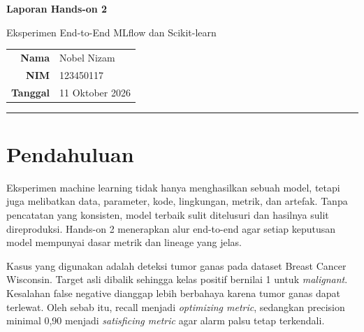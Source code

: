 \documentclass[11pt,a4paper]{article}
\begin{document}
\begin{center}
  {\LARGE\bfseries\color{navy} Laporan Hands-on 2}\par
  \vspace{3pt}
  {\large Eksperimen End-to-End MLflow dan Scikit-learn}\par
  \vspace{10pt}
  \begin{tabular}{rl}
    \textbf{Nama} & Nobel Nizam \\
    \textbf{NIM}  & 123450117 \\
    \textbf{Tanggal} & 11 Oktober 2026
  \end{tabular}
\end{center}

\vspace{8pt}
\hrule
\vspace{8pt}

\begin{abstract}
Praktik ini membangun alur eksperimen klasifikasi tumor ganas dari persiapan data hingga rancangan pemuatan model produksi. Dataset Breast Cancer Wisconsin dibagi secara tetap, kemudian delapan konfigurasi baseline dan kandidat dibandingkan menggunakan 5-fold stratified cross-validation. SVC selanjutnya dituning pada 12 kombinasi parameter. Konfigurasi terbaik, yaitu $C=10$ dan $\gamma=\texttt{scale}$, memperoleh recall CV $0{,}965 \pm 0{,}029$ dengan precision $0{,}971 \pm 0{,}018$. Pada test set yang hanya digunakan sekali, model menghasilkan recall 0,929, precision 1,000, F1 0,963, dan ROC-AUC 0,993. Implementasi juga mencakup pencatatan MLflow, nested runs, aturan seleksi otomatis, Model Registry, quality gate, alias \texttt{champion}, DVC, dan audit lineage.
\end{abstract}

\tableofcontents

\section{Pendahuluan}

Eksperimen machine learning tidak hanya menghasilkan sebuah model, tetapi juga melibatkan data, parameter, kode, lingkungan, metrik, dan artefak. Tanpa pencatatan yang konsisten, model terbaik sulit ditelusuri dan hasilnya sulit direproduksi. Hands-on 2 menerapkan alur end-to-end agar setiap keputusan model mempunyai dasar metrik dan lineage yang jelas.

Kasus yang digunakan adalah deteksi tumor ganas pada dataset Breast Cancer Wisconsin. Target asli dibalik sehingga kelas positif bernilai 1 untuk \emph{malignant}. Kesalahan false negative dianggap lebih berbahaya karena tumor ganas dapat terlewat. Oleh sebab itu, recall menjadi \emph{optimizing metric}, sedangkan precision minimal 0,90 menjadi \emph{satisficing metric} agar alarm palsu tetap terkendali.
\end{document}
